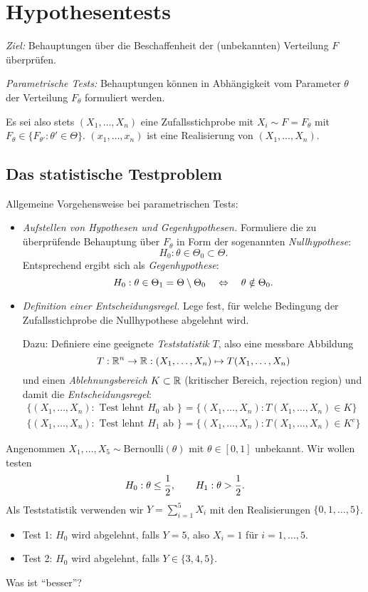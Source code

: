 \chapter{Hypothesentests}
\emph{Ziel:} Behauptungen über die Beschaffenheit der (unbekannten) Verteilung
$F$ überprüfen.

\emph{Parametrische Tests:} Behauptungen können in Abhängigkeit vom Parameter
$\theta$ der Verteilung $F_\theta$ formuliert werden.

Es sei also stets $(X_1, \ldots, X_n)$ eine Zufallsstichprobe mit $X_i \sim F =
F_\theta$ mit $F_\theta \in \{ F_{\theta'} : \theta' \in \Theta\}$. $(x_1,
\ldots, x_n)$ ist eine Realisierung von $(X_1, \ldots, X_n)$.

\section{Das statistische Testproblem}
Allgemeine Vorgehensweise bei parametrischen Tests:
\begin{itemize}
\item \emph{Aufstellen von Hypothesen und Gegenhypothesen.} Formuliere die zu
  überprüfende Behauptung über $F_\theta$ in Form der sogenannten
  \emph{Nullhypothese}:
  \[ H_0 : \theta \in \Theta_0 \subset \Theta. \]
  Entsprechend ergibt sich als \emph{Gegenhypothese}:
  \[ H_0 : \theta \in \Theta_1 = \Theta \setminus \Theta_0 \quad \Leftrightarrow \quad \theta \notin
    \Theta_0. \]
\item \emph{Definition einer Entscheidungsregel.} Lege fest, für welche
  Bedingung der Zufallsstichprobe die Nullhypothese abgelehnt wird.

  Dazu: Definiere eine geeignete \emph{Teststatistik} $T$, also eine messbare
  Abbildung
  \[ T: \mathbb{R}^n \to \mathbb{R}: (X_1, \ldots, X_n) \mapsto T(X_1, \ldots, X_n)\]
  und einen \emph{Ablehnungsbereich} $K \subset \mathbb{R}$ (kritischer Bereich,
  rejection region) und damit die \emph{Entscheidungsregel}:
  \begin{align*}
    \{ (X_1, \ldots, X_n) : \text{ Test lehnt $H_0$ ab } \}
    &= \{ (X_1, \ldots, X_n) : T(X_1, \ldots, X_n) \in K \} \\
        \{ (X_1, \ldots, X_n) : \text{ Test lehnt $H_1$ ab } \}
    &= \{ (X_1, \ldots, X_n) : T(X_1, \ldots, X_n) \in K^c \}
  \end{align*}
\end{itemize}

\begin{exmp}
  Angenommen $X_1, \ldots, X_5 \sim \mathrm{Bernoulli}(\theta)$ mit $\theta \in
  [0,1]$ unbekannt. Wir wollen testen
  \[ H_0 : \theta \le \frac{1}{2}, \qquad H_1 : \theta > \frac{1}{2}. \]
  Als Teststatistik verwenden wir $Y = \sum_{i=1}^5 X_i$ mit den Realisierungen
  $\{0, 1, \ldots, 5\}$.
  \begin{itemize}
  \item Test 1: $H_0$ wird abgelehnt, falls $Y = 5$, also $X_i = 1$ für $i =
    1, \ldots, 5$.
  \item Test 2: $H_0$ wird abgelehnt, falls $Y \in \{3,4,5\}$.
  \end{itemize}
  Was ist ``besser''?
\end{exmp}

